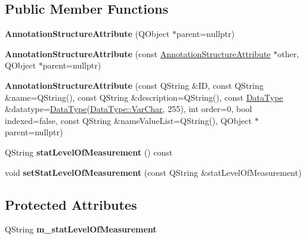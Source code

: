 \subsection*{Public Member Functions}
\begin{DoxyCompactItemize}
\item 
\mbox{\label{class_annotation_structure_attribute_a1c225bf9334ea55c4e483a42e918ce57}} 
{\bfseries Annotation\+Structure\+Attribute} (Q\+Object $\ast$parent=nullptr)
\item 
\mbox{\label{class_annotation_structure_attribute_a16633f3bac8c805914a5ecec94109a4f}} 
{\bfseries Annotation\+Structure\+Attribute} (const \hyperlink{class_annotation_structure_attribute}{Annotation\+Structure\+Attribute} $\ast$other, Q\+Object $\ast$parent=nullptr)
\item 
\mbox{\label{class_annotation_structure_attribute_a0e8e6c7dca3c8e7377613a33dfcb3dc7}} 
{\bfseries Annotation\+Structure\+Attribute} (const Q\+String \&ID, const Q\+String \&name=Q\+String(), const Q\+String \&description=Q\+String(), const \hyperlink{class_data_type}{Data\+Type} \&datatype=\hyperlink{class_data_type}{Data\+Type}(\hyperlink{class_data_type_a8df455d8d3949b604fbb2967dfeff239a160c768176611f2649889e252c756539}{Data\+Type\+::\+Var\+Char}, 255), int order=0, bool indexed=false, const Q\+String \&name\+Value\+List=Q\+String(), Q\+Object $\ast$parent=nullptr)
\item 
\mbox{\label{class_annotation_structure_attribute_a3783bea87144d5cbae63a1eb28c4ea94}} 
Q\+String {\bfseries stat\+Level\+Of\+Measurement} () const
\item 
\mbox{\label{class_annotation_structure_attribute_af04deec4b660909ab6d2d22c4638c8ed}} 
void {\bfseries set\+Stat\+Level\+Of\+Measurement} (const Q\+String \&stat\+Level\+Of\+Measurement)
\end{DoxyCompactItemize}
\subsection*{Protected Attributes}
\begin{DoxyCompactItemize}
\item 
\mbox{\label{class_annotation_structure_attribute_a45098dd90f9d7638383815a7a75ed745}} 
Q\+String {\bfseries m\+\_\+stat\+Level\+Of\+Measurement}
\end{DoxyCompactItemize}
